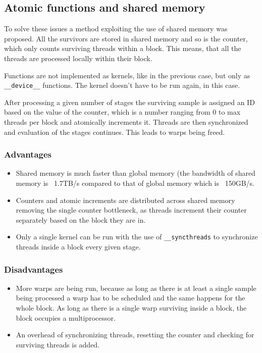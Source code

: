 \subsection{Atomic functions and shared memory}\label{subsec:afsm}

To solve these issues a method exploiting the use of shared memory was proposed. All the survivors are stored in shared memory and so is the counter, which only counts surviving threads within a block. This means, that all the threads are processed locally within their block.

Functions are not implemented as kernels, like in the previous case, but only as \verb|__device__| functions. The kernel doesn't have to be run again,  in this case.

After processing a given number of stages the surviving sample is assigned an ID based on the value of the counter, which is a number ranging from 0 to max threads per block and atomically increments it. Threads are then synchronized and evaluation of the stages continues. This leads to warps being freed.

\subsubsection{Advantages}

\begin{itemize}
	\item Shared memory is much faster than global memory (the bandwidth of shared memory is ~1.7TB/s compared to that of global memory which is ~150GB/s.
	\item Counters and atomic increments are distributed across shared memory removing the single counter bottleneck, as threads increment their counter separately based on the block they are in.
	\item Only a single kernel can be run with the use of \verb|__syncthreads| to synchronize threads inside a block every given stage.
\end{itemize}

\subsubsection{Disadvantages}

\begin{itemize}
	\item More warps are being run, because as long as there is at least a single sample being processed a warp has to be scheduled and the same happens for the whole block. As long as there is a single warp surviving inside a block, the block occupies a multiprocessor.
	\item An overhead of synchronizing threads, resetting the counter and checking for surviving threads is added.
\end{itemize}

